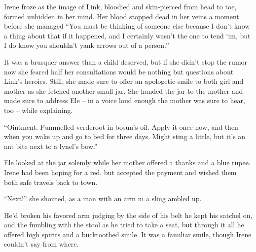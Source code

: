 \documentclass[../FGP.tex]{subfiles}
\begin{document}
\begin{fragment}
Irene froze as the image of Link, bloodied and skin-pierced from head to toe, formed unbidden in her mind.  Her blood stopped dead in her veins a moment before she managed ``You must be thinking of someone else because I don't know a thing about that if it happened, and I certainly wasn't the one to tend `im, but I do know you shouldn't yank arrows out of a person.''

It was a brusquer answer than a child deserved, but if she didn't stop the rumor now she feared half her consultations would be nothing but questions about Link's heroics. Still, she made sure to offer an apologetic smile to both girl and mother as she fetched another small jar. She handed the jar to the mother and made sure to address Ele -- in a voice loud enough the mother was sure to hear, too -- while explaining. 

``Ointment. Pummelled verderoot in bosun's oil. Apply it once now, and then when you wake up and go to bed for three days. Might sting a little, but it's an ant bite next to a lynel's bow.'' 

Ele looked at the jar solemly while her mother offered a thanks and a blue rupee. Irene had been hoping for a red, but accepted the payment and wished them both safe travels back to town. 

``Next!'' she shouted, as a man with an arm in a sling ambled up. 

He'd broken his favored arm judging by the side of his belt he kept his satchel on, and the fumbling with the stool as he tried to take a seat, but through it all he offered high spirits and a bucktoothed smile. It was a familiar smile, though Irene couldn't say from where.  
\end{fragment}
\begin{fragment}

\end{fragment}
\end{document}
